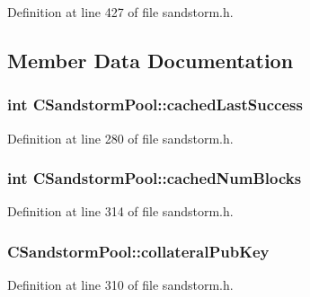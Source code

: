 Definition at line 427 of file sandstorm.\+h.



\subsection{Member Data Documentation}
\hypertarget{class_c_sandstorm_pool_a8da1107d7613a095879e3c0a4165e6c1}{}
\subsubsection[{cached\+Last\+Success}]{\setlength{\rightskip}{0pt plus 5cm}int C\+Sandstorm\+Pool\+::cached\+Last\+Success}\label{class_c_sandstorm_pool_a8da1107d7613a095879e3c0a4165e6c1}


Definition at line 280 of file sandstorm.\+h.

\hypertarget{class_c_sandstorm_pool_a927020441f683c7188a253e97f376106}{}
\subsubsection[{cached\+Num\+Blocks}]{\setlength{\rightskip}{0pt plus 5cm}int C\+Sandstorm\+Pool\+::cached\+Num\+Blocks}\label{class_c_sandstorm_pool_a927020441f683c7188a253e97f376106}


Definition at line 314 of file sandstorm.\+h.

\hypertarget{class_c_sandstorm_pool_afc6af6d3ef8fbe2c6238d3564145a015}{}
\subsubsection[{collateral\+Pub\+Key}]{ C\+Sandstorm\+Pool\+::collateral\+Pub\+Key}\label{class_c_sandstorm_pool_afc6af6d3ef8fbe2c6238d3564145a015}


Definition at line 310 of file sandstorm.\+h.

\hypertarget{class_c_sandstorm_pool_affec253e6cc6927c89002d1c7ccc4cf0}{}
